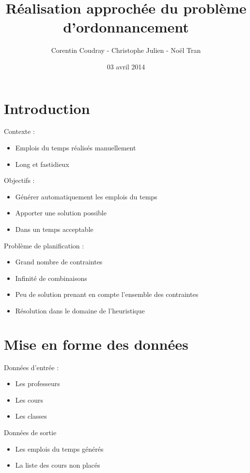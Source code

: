 \documentclass{beamer}
\title{Réalisation approchée du problème d'ordonnancement}
\author{Corentin Coudray - Christophe Julien - Noël Tran}
\institute{ESME SUDRIA}
\date{03 avril 2014}
\begin{document}
\begin{frame}
\titlepage
\end{frame}

\section{Introduction}
\begin{frame}
Contexte : 
\begin{itemize}
\item Emplois du temps réalisés manuellement
\item Long et fastidieux\\
\end{itemize}
\end{frame}

\begin{frame}
Objectifs :
\begin{itemize}
\item Générer automatiquement les emplois du temps
\item Apporter une solution possible
\item Dans un temps acceptable
\end{itemize}
\end{frame}

\begin{frame}
Problème de planification : 
\begin{itemize}
\item Grand nombre de contraintes
\item Infinité de combinaisons
\item Peu de solution prenant en compte l'ensemble des contraintes
\item Résolution dans le domaine de l'heuristique
\end{itemize}
\end{frame}

\section{Mise en forme des données}

\begin{frame}
Données d'entrée : 
\begin{itemize}
\item Les professeurs
\item Les cours
\item Les classes
\end{itemize}
\vspace{\baselineskip}
Données de sortie
\begin{itemize}
\item Les emplois du temps générés
\item La liste des cours non placés
\end{itemize}
\end{frame}
\end{document}
